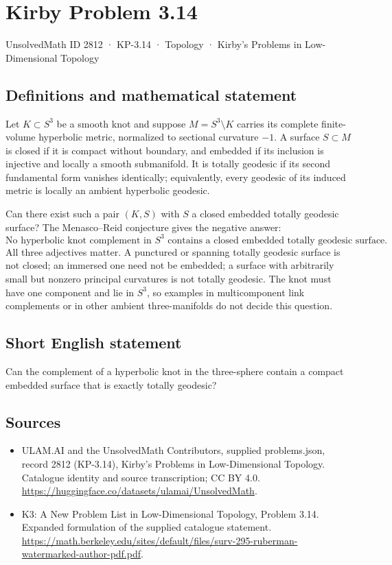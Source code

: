\documentclass[11pt,a4paper]{article}
\begin{document}
\section*{Kirby Problem 3.14}\label{2812}
{\small UnsolvedMath ID 2812 · KP-3.14 · Topology · Kirby's Problems in Low-Dimensional Topology}
\subsection{Definitions and mathematical statement}
Let $K\subset S^3$ be a smooth knot and suppose $M=S^3\setminus K$ carries
its complete finite-volume hyperbolic metric, normalized to sectional curvature
$-1$. A surface $S\subset M$ is closed if it is compact without boundary,
and embedded if its inclusion is injective and locally a smooth submanifold.
It is totally geodesic if its second fundamental form vanishes identically;
equivalently, every geodesic of its induced metric is locally an ambient
hyperbolic geodesic.

Can there exist such a pair $(K,S)$ with $S$ a closed embedded totally
geodesic surface? The Menasco--Reid conjecture gives the negative answer:
\[
 \text{No hyperbolic knot complement in }S^3\text{ contains a closed
 embedded totally geodesic surface.}
\]
All three adjectives matter. A punctured or spanning totally geodesic surface
is not closed; an immersed one need not be embedded; a surface with arbitrarily
small but nonzero principal curvatures is not totally geodesic. The knot must
have one component and lie in $S^3$, so examples in multicomponent link
complements or in other ambient three-manifolds do not decide this question.
\subsection{Short English statement}
Can the complement of a hyperbolic knot in the three-sphere contain a compact embedded surface that is exactly totally geodesic?
\subsection{Sources}
\begin{itemize}
\item[S1] ULAM.AI and the UnsolvedMath Contributors, supplied problems.json, record 2812 (KP-3.14), Kirby's Problems in Low-Dimensional Topology. Catalogue identity and source transcription; CC BY 4.0.
\url{https://huggingface.co/datasets/ulamai/UnsolvedMath}.
\item[S2] K3: A New Problem List in Low-Dimensional Topology, Problem 3.14. Expanded formulation of the supplied catalogue statement.
\url{https://math.berkeley.edu/sites/default/files/surv-295-ruberman-watermarked-author-pdf.pdf}.
\end{itemize}
\end{document}

